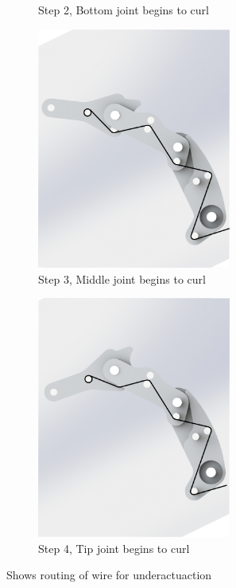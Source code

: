 \begin{figure}
\begin{subfigure}{.45\linewidth}
        \caption{Step 2, Bottom joint begins to curl}
        \label{fig:routing2}
    \end{subfigure}
    \begin{subfigure}{.45\linewidth}
        \centering
\includegraphics[width=0.7\textwidth]{Images/wirerouting/routing3.png}
        \caption{Step 3, Middle joint begins to curl}
        \label{label:routing3}
    \end{subfigure}
    \begin{subfigure}{.45\linewidth}
        \centering
        \includegraphics[width=0.7\textwidth]{Images/wirerouting/routing4.png}          
        \caption{Step 4, Tip joint begins to curl}
        \label{label:routing4}
    \end{subfigure}
    \caption{Shows routing of wire for underactuaction}
    \label{figure:routing}
\end{figure}